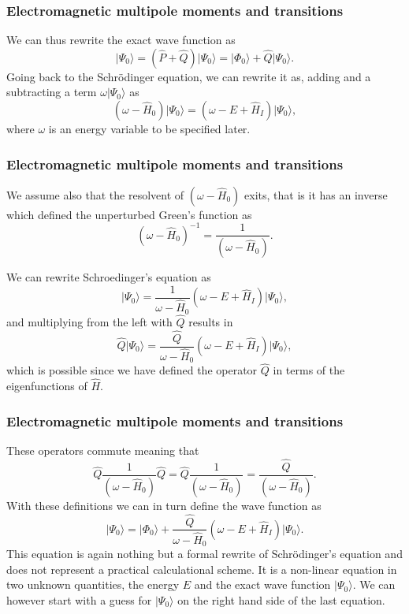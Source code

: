 \documentclass{beamer}
\begin{document}
\begin{frame}
\frametitle{Electromagnetic multipole moments and transitions}

\begin{block}{}
We can thus rewrite the exact wave function as
\[
\vert \Psi_0\rangle= (\hat{P}+\hat{Q})\vert \Psi_0\rangle=\vert \Phi_0\rangle+\hat{Q}\vert \Psi_0\rangle.
\]
Going back to the Schr\"odinger equation, we can rewrite it as, adding and a subtracting a term $\omega \vert \Psi_0\rangle$ as
\[
\left(\omega-\hat{H}_0\right)\vert \Psi_0\rangle=\left(\omega-E+\hat{H}_I\right)\vert \Psi_0\rangle,
\]
where $\omega$ is an energy variable to be specified later. 
\end{block}
\end{frame}

\begin{frame}
\frametitle{Electromagnetic multipole moments and transitions}

\begin{block}{}
We assume also that the resolvent of $\left(\omega-\hat{H}_0\right)$ exits, that is
it has an inverse which defined the unperturbed Green's function as
\[
\left(\omega-\hat{H}_0\right)^{-1}=\frac{1}{\left(\omega-\hat{H}_0\right)}.
\]

We can rewrite Schroedinger's equation as
\[
\vert \Psi_0\rangle=\frac{1}{\omega-\hat{H}_0}\left(\omega-E+\hat{H}_I\right)\vert \Psi_0\rangle,
\]
and multiplying from the left with $\hat{Q}$ results in
\[
\hat{Q}\vert \Psi_0\rangle=\frac{\hat{Q}}{\omega-\hat{H}_0}\left(\omega-E+\hat{H}_I\right)\vert \Psi_0\rangle,
\]
which is possible since we have defined the operator $\hat{Q}$ in terms of the eigenfunctions of $\hat{H}$.

\end{block}
\end{frame}

\begin{frame}
\frametitle{Electromagnetic multipole moments and transitions}

\begin{block}{}
These operators commute meaning that
\[
\hat{Q}\frac{1}{\left(\omega-\hat{H}_0\right)}\hat{Q}=\hat{Q}\frac{1}{\left(\omega-\hat{H}_0\right)}=\frac{\hat{Q}}{\left(\omega-\hat{H}_0\right)}.
\]
With these definitions we can in turn define the wave function as 
\[
\vert \Psi_0\rangle=\vert \Phi_0\rangle+\frac{\hat{Q}}{\omega-\hat{H}_0}\left(\omega-E+\hat{H}_I\right)\vert \Psi_0\rangle.
\]
This equation is again nothing but a formal rewrite of Schr\"odinger's equation
and does not represent a practical calculational scheme.  
It is a non-linear equation in two unknown quantities, the energy $E$ and the exact
wave function $\vert \Psi_0\rangle$. We can however start with a guess for $\vert \Psi_0\rangle$ on the right hand side of the last equation.
\end{block}
\end{frame}
\end{document}
